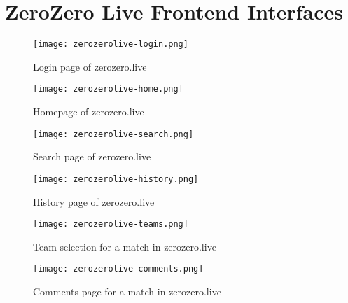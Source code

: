 \chapter{ZeroZero Live Frontend Interfaces}

\begin{figure}[h]
    \begin{center}
        \leavevmode
        \texttt{[image: zerozerolive-login.png]}
        \caption{Login page of zerozero.live}
        \label{fig:zerozerolive-login}
    \end{center}
\end{figure}

\begin{figure}
    \begin{center}
        \leavevmode
        \texttt{[image: zerozerolive-home.png]}
        \caption{Homepage of zerozero.live}
        \label{fig:zerozerolive-home}
    \end{center}
\end{figure}

\begin{figure}
    \begin{center}
        \leavevmode
        \texttt{[image: zerozerolive-search.png]}
        \caption{Search page of zerozero.live}
        \label{fig:zerozerolive-search}
    \end{center}
\end{figure}

\begin{figure}
    \begin{center}
        \leavevmode
        \texttt{[image: zerozerolive-history.png]}
        \caption{History page of zerozero.live}
        \label{fig:zerozerolive-history}
    \end{center}
\end{figure}

\begin{figure}
    \begin{center}
        \leavevmode
        \texttt{[image: zerozerolive-teams.png]}
        \caption{Team selection for a match in zerozero.live}
        \label{fig:zerozerolive-teams}
    \end{center}
\end{figure}

\begin{figure}[h]
    \begin{center}
        \leavevmode
        \texttt{[image: zerozerolive-comments.png]}
        \caption{Comments page for a match in zerozero.live}
        \label{fig:annex-zerozerolive-comments}
    \end{center}
\end{figure}
